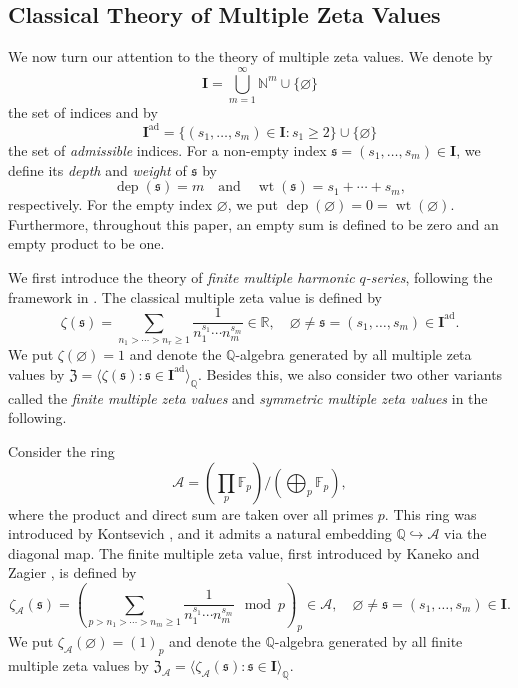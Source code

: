 \documentclass[12pt,reqno]{amsart}
\numberwithin{equation}{section}
\theoremstyle{plain}
\theoremstyle{definition}
\theoremstyle{remark}
\newcommand{\NN}{\mathbb{N}}
\newcommand{\QQ}{\mathbb{Q}}
\newcommand{\Acal}{\mathcal{A}}
\newcommand{\dep}{\operatorname{dep}}
\newcommand{\wt}{\operatorname{wt}}
\newcommand{\ww}[1]{\mathfrak{#1}}
\newcommand{\Ical}{\mathbf{I}}
\newcommand{\Zcal}{\mathfrak{Z}}
\newcommand{\ad}{\mathrm{ad}}
\begin{document}
\subsection{Classical Theory of Multiple Zeta Values} We now turn our attention to the theory of multiple zeta values. We denote by $$\Ical=\bigcup_{m=1}^\infty \NN^m\cup\{\varnothing\}$$  the set of indices and by $$\Ical^{\ad}=\{(s_1,\ldots,s_m)\in\Ical:s_1\geq 2\}\cup\{\varnothing\}$$ the set of \textit{admissible} indices. For a non-empty index $\ww{s}=(s_1,\ldots,s_m)\in\Ical$, we define its \textit{depth} and \textit{weight} of $\ww{s}$ by
\[
\dep(\ww{s})=m\quad \text{and} \quad \wt(\ww{s})=s_1+\cdots+s_m,
\]
respectively.
For the empty index $\varnothing$, we put $\dep(\varnothing)=0=\wt(\varnothing)$. Furthermore, throughout this paper, an empty sum is defined to be zero and an empty product to be one.

We first introduce the theory of \textit{finite multiple harmonic $q$-series}, following the framework in \cite{BTT18}. The classical multiple zeta value is defined by
$$\zeta(\ww{s}) = \sum_{n_1 > \cdots > n_r \geq 1} \frac{1}{n_1^{s_1} \cdots n_m^{s_m}} \in \mathbb{R}, \quad \varnothing\neq \ww{s}=(s_1,\ldots,s_m) \in \Ical^{\text{ad}}.$$
We put $\zeta(\varnothing)=1$ and denote the $\mathbb{Q}$-algebra generated by all multiple zeta values by $\Zcal = \langle \zeta(\ww{s}) : \ww{s} \in \Ical^{\text{ad}} \rangle_{\mathbb{Q}}$. 
Besides this, we also consider two other variants called the \textit{finite multiple zeta values} and \textit{symmetric multiple zeta values} in the following.

Consider the ring 
$$\mathcal{A} = \left(\prod_p \mathbb{F}_p\right) / \left(\bigoplus_p \mathbb{F}_p\right),$$
where the product and direct sum are taken over all primes $p$. This ring was introduced by Kontsevich \cite{Kontsevich2009}, and it admits a natural embedding $\mathbb{Q} \hookrightarrow \mathcal{A}$ via the diagonal map. The finite multiple zeta value, first introduced by Kaneko and Zagier \cite{KanekoZagier}, is defined by
$$\zeta_{\Acal}(\ww{s})=\left(\sum_{p>n_1>\cdots>n_m\geq 1}\frac{1}{n_1^{s_1}\cdots n_m^{s_m}}\mod{p}\right)_p\in\Acal,\quad \varnothing\neq \ww{s}=(s_1,\ldots,s_m)\in\Ical.$$
We put $\zeta_{\Acal}(\varnothing)=(1)_p$ and denote the $\QQ$-algebra generated by all finite multiple zeta values by $\Zcal_\Acal=\langle \zeta_{\Acal}(\ww{s}):\ww{s}\in\Ical\rangle_\QQ$. 
\end{document}
